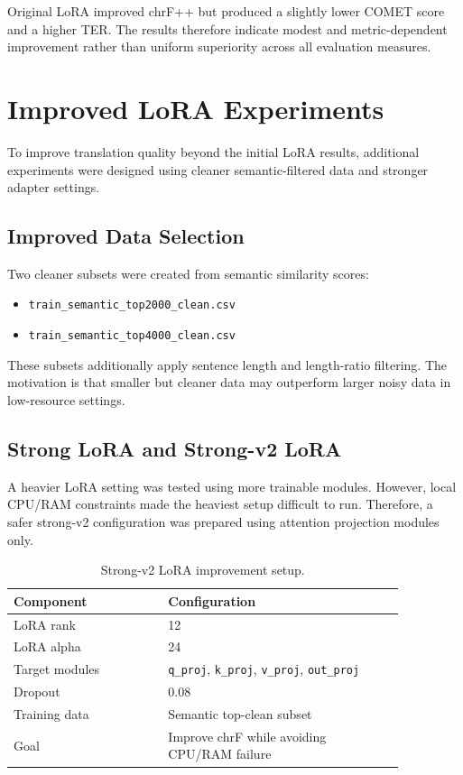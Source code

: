 \documentclass[conference]{IEEEtran}
\begin{document}
Original LoRA improved chrF++ but produced a slightly lower
COMET score and a higher TER. The results therefore indicate
modest and metric-dependent improvement rather than uniform
superiority across all evaluation measures.

\section{Improved LoRA Experiments}

To improve translation quality beyond the initial LoRA results, additional experiments were designed using cleaner semantic-filtered data and stronger adapter settings.

\subsection{Improved Data Selection}

Two cleaner subsets were created from semantic similarity scores:

\begin{itemize}
    \item \texttt{train\_semantic\_top2000\_clean.csv}
    \item \texttt{train\_semantic\_top4000\_clean.csv}
\end{itemize}

These subsets additionally apply sentence length and length-ratio filtering. The motivation is that smaller but cleaner data may outperform larger noisy data in low-resource settings.

\subsection{Strong LoRA and Strong-v2 LoRA}

A heavier LoRA setting was tested using more trainable modules. However, local CPU/RAM constraints made the heaviest setup difficult to run. Therefore, a safer strong-v2 configuration was prepared using attention projection modules only.

\begin{table}[H]
\centering
\caption{Strong-v2 LoRA improvement setup.}
\footnotesize
\begin{tabular}{p{0.34\linewidth}p{0.52\linewidth}}
\toprule
\textbf{Component} & \textbf{Configuration} \\
\midrule
LoRA rank & 12 \\
LoRA alpha & 24 \\
Target modules & \texttt{q\_proj}, \texttt{k\_proj}, \texttt{v\_proj}, \texttt{out\_proj} \\
Dropout & 0.08 \\
Training data & Semantic top-clean subset \\
Goal & Improve chrF while avoiding CPU/RAM failure \\
\bottomrule
\end{tabular}
\end{table}
\end{document}

